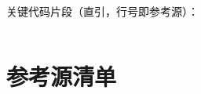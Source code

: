 \documentclass[UTF8]{ctexart}
\begin{document}
关键代码片段（直引，行号即参考源）：





\begin{lstlisting}[firstline=44,lastline=49,language=bash]
\end{lstlisting}


\section{参考源清单}
\end{document}
